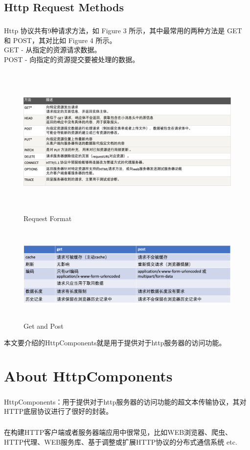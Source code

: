 \documentclass{article}
\begin{document}
	\subsection{Http Request Methods}
	\subparagraph{}
	\begin{CJK}{UTF8}{gbsn}
		Http 协议共有9种请求方法，如 Figure 3 所示，其中最常用的两种方法是 GET 和 POST，其对比如 Figure 4 所示。\\
		GET - 从指定的资源请求数据。\\
		POST - 向指定的资源提交要被处理的数据。
	\end{CJK}{}
	\begin{figure}[H]
		\centering
		\includegraphics[height = 7.6cm, width = 16cm]{pics/4_9ways_of_http_request.png}	
		\caption{Request Format}
	\end{figure}
	\begin{figure}[H]
		\centering
		\includegraphics[height = 4.8cm, width = 15cm]{pics/5_get_post.png}	
		\caption{Get and Post}
	\end{figure}
	\begin{CJK}{UTF8}{gbsn}
		本文要介绍的HttpComponents就是用于提供对于http服务器的访问功能。
	\end{CJK}{}
	\section{About HttpComponents}
	\begin{CJK}{UTF8}{gbsn}
		\subparagraph{}
		HttpComponents：用于提供对于http服务器的访问功能的超文本传输协议，其对HTTP底层协议进行了很好的封装。
		\subparagraph{}
		在构建HTTP客户端或者服务器端应用中很常见，比如WEB浏览器、爬虫、HTTP代理、WEB服务库、基于调整或扩展HTTP协议的分布式通信系统 etc.  
	\end{CJK}{}
\end{document}
